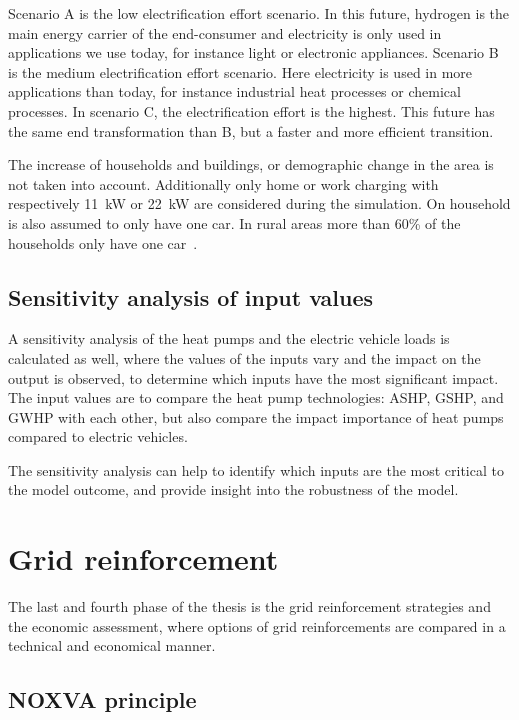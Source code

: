 Scenario A is the low electrification effort scenario. In this future, hydrogen is the main energy carrier of the end-consumer and electricity is only used in applications we use today, for instance light or electronic appliances. Scenario B is the medium electrification effort scenario. Here electricity is used in more applications than today, for instance industrial heat processes or chemical processes. In scenario C, the electrification effort is the highest. This future has the same end transformation than B, but a faster and more efficient transition. 

        
The increase of households and buildings, or demographic change in the area is not taken into account. Additionally only home or work charging with respectively 11~kW or 22~kW are considered during the simulation. On household is also assumed to only have one car. In rural areas more than 60\% of the households only have one car~\cite{VDEFNN_2021}.


\subsection{Sensitivity analysis of input values}

A sensitivity analysis of the heat pumps and the electric vehicle loads is calculated as well, where the values of the inputs vary and the impact on the output is observed, to determine which inputs have the most significant impact. The input values are to compare the heat pump technologies: ASHP, GSHP, and GWHP with each other, but also compare the impact importance of heat pumps compared to electric vehicles. 

The sensitivity analysis can help to identify which inputs are the most critical to the model outcome, and provide insight into the robustness of the model. 


\section{Grid reinforcement}

The last and fourth phase of the thesis is the grid reinforcement strategies and the economic assessment, where options of grid reinforcements are compared in a technical and economical manner.  

\subsection{NOXVA principle}

